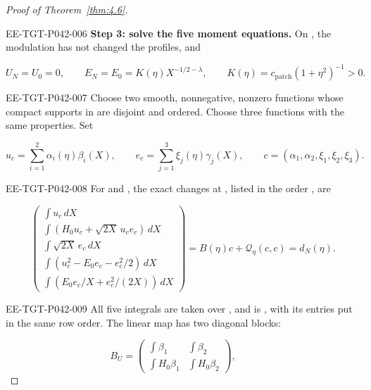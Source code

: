 \begin{proof}[Proof of Theorem~\ref{thm:4.6}]
\begin{EESegment}{EE-TGT-P042-006}
\noindent\textbf{Step 3: solve the five moment equations.}
On , the modulation has not changed the
profiles, and
\end{EESegment}
\[
U_N=U_0=0,
\qquad
E_N=E_0=K(\eta)X^{-1/2-\lambda},
\qquad
K(\eta)=c_{\mathrm{patch}}(1+\eta^2)^{-1}>0.
\]
\begin{EESegment}{EE-TGT-P042-007}
Choose two smooth, nonnegative, nonzero functions
 whose compact supports in
 are disjoint and ordered. Choose three functions
 with the same properties. Set
\end{EESegment}
\[
u_c=\sum_{i=1}^2\alpha_i(\eta)\beta_i(X),
\qquad
e_c=\sum_{j=1}^3\xi_j(\eta)\gamma_j(X),
\qquad
c=(\alpha_1,\alpha_2,\xi_1,\xi_2,\xi_3).
\]
\begin{EESegment}{EE-TGT-P042-008}
For  and
, the exact changes at
, listed in the order
, are
\end{EESegment}
\begin{equation}
\begin{pmatrix}
\int u_c\,dX\\
\int(H_0u_c+\sqrt{2X}\,u_ce_c)\,dX\\
\int\sqrt{2X}\,e_c\,dX\\
\int(u_c^2-E_0e_c-e_c^2/2)\,dX\\
\int(E_0e_c/X+e_c^2/(2X))\,dX
\end{pmatrix}
=B(\eta)c+\mathcal Q_\eta(c,c)=d_N(\eta).
\tag{4.42}\label{eq:4.42}
\end{equation}
\begin{EESegment}{EE-TGT-P042-009}
All five integrals are taken over , and
 is , with its
entries put in the same row order. The linear map has two diagonal blocks:
\end{EESegment}
\[
B_U=
\begin{pmatrix}
\int\beta_1&\int\beta_2\\
\int H_0\beta_1&\int H_0\beta_2
\end{pmatrix},
\qquad
\]
\end{proof}
